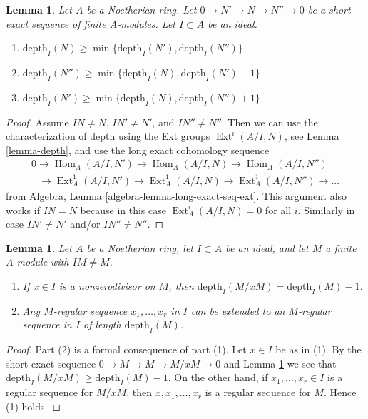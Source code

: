 \documentclass{stacks-project}
\theoremstyle{plain}
\newtheorem{lemma}[subsection]{Lemma}
\theoremstyle{definition}
\theoremstyle{remark}
\numberwithin{equation}{subsection}
\def\Hom{\mathop{\mathrm{Hom}}\nolimits}
\def\Ext{\mathop{\mathrm{Ext}}\nolimits}
\begin{document}
\begin{lemma}
\label{lemma-depth-in-ses}
Let $A$ be a Noetherian ring. Let $0 \to N' \to N \to N'' \to 0$
be a short exact sequence of finite $A$-modules.
Let $I \subset A$ be an ideal.
\begin{enumerate}
\item
$\text{depth}_I(N) \geq \min\{\text{depth}_I(N'), \text{depth}_I(N'')\}$
\item
$\text{depth}_I(N'') \geq \min\{\text{depth}_I(N), \text{depth}_I(N') - 1\}$
\item
$\text{depth}_I(N') \geq \min\{\text{depth}_I(N), \text{depth}_I(N'') + 1\}$
\end{enumerate}
\end{lemma}

\begin{proof}
Assume $IN \not = N$, $IN' \not = N'$, and $IN'' \not = N''$. Then we
can use the characterization of depth using the Ext groups
$\Ext^i(A/I, N)$, see Lemma \ref{lemma-depth},
and use the long exact cohomology sequence
$$
\begin{matrix}
0
\to \Hom_A(A/I, N')
\to \Hom_A(A/I, N)
\to \Hom_A(A/I, N'')
\\
\phantom{0\ }
\to \Ext^1_A(A/I, N')
\to \Ext^1_A(A/I, N)
\to \Ext^1_A(A/I, N'')
\to \ldots
\end{matrix}
$$
from Algebra, Lemma \ref{algebra-lemma-long-exact-seq-ext}.
This argument also works if $IN = N$
because in this case $\Ext^i_A(A/I, N) = 0$ for all $i$.
Similarly in case $IN' \not = N'$ and/or $IN'' \not = N''$.
\end{proof}

\begin{lemma}
\label{lemma-depth-drops-by-one}
Let $A$ be a Noetherian ring, let $I \subset A$ be an ideal, and
let $M$ a finite $A$-module with $IM \not = M$.
\begin{enumerate}
\item If $x \in I$ is a nonzerodivisor on $M$, then
$\text{depth}_I(M/xM) = \text{depth}_I(M) - 1$.
\item Any $M$-regular sequence $x_1, \ldots, x_r$ in $I$ can be extended to an
$M$-regular sequence in $I$ of length $\text{depth}_I(M)$.
\end{enumerate}
\end{lemma}

\begin{proof}
Part (2) is a formal consequence of part (1). Let $x \in I$ be as in (1).
By the short exact sequence $0 \to M \to M \to M/xM \to 0$ and
Lemma \ref{lemma-depth-in-ses} we see that
$\text{depth}_I(M/xM) \geq \text{depth}_I(M) - 1$.
On the other hand, if $x_1, \ldots, x_r \in I$
is a regular sequence for $M/xM$, then $x, x_1, \ldots, x_r$
is a regular sequence for $M$. Hence (1) holds.
\end{proof}
\end{document}
